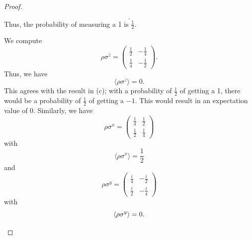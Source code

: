 \begin{proof}
\begin{parts}
\[		.\] 
		Thus, the probability of measuring a 1 is $\frac{1}{2}$.
	\item We compute
		\[
			\rho \sigma^z = \begin{pmatrix} \frac{1}{2} & -\frac{1}{4} \\ \frac{1}{4} & -\frac{1}{2} \end{pmatrix} 
		.\] 
		Thus, we have
		\[
		\langle \rho\sigma^z\rangle = 0
		.\] 
		This agrees with the result in (c); with a probability of $\frac{1}{2}$ of getting a 1, there would be a probability of $\frac{1}{2}$ of getting a $-1$. This would result in an expectation value of 0. Similarly, we have
		\[
			\rho\sigma^x = \begin{pmatrix} \frac{1}{4} & \frac{1}{2} \\ \frac{1}{2} & \frac{1}{4} \end{pmatrix} 
		\]
		with
		\[
			\langle \rho \sigma^x\rangle = \frac{1}{2}
		\]
		and
		\[
			\rho \sigma^y = \begin{pmatrix} \frac{i}{4} & -\frac{i}{2} \\ \frac{i}{2} & -\frac{i}{4} \end{pmatrix} 
		\]
		with
		\[
		\langle \rho\sigma^y \rangle = 0
		.\qedhere\] 
	\end{parts}
\end{proof}


